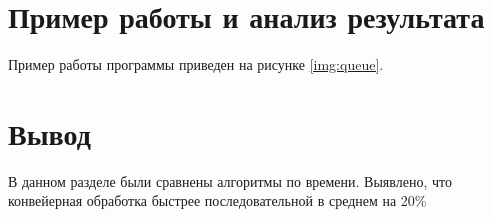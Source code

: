 %

\section{Пример работы и анализ результата}

Пример работы программы приведен на рисунке \ref{img:queue}.
\clearpage
{}
\clearpage

\section*{Вывод}

В данном разделе были сравнены алгоритмы по времени. Выявлено,
что конвейерная обработка быстрее последовательной в среднем на 20\%
